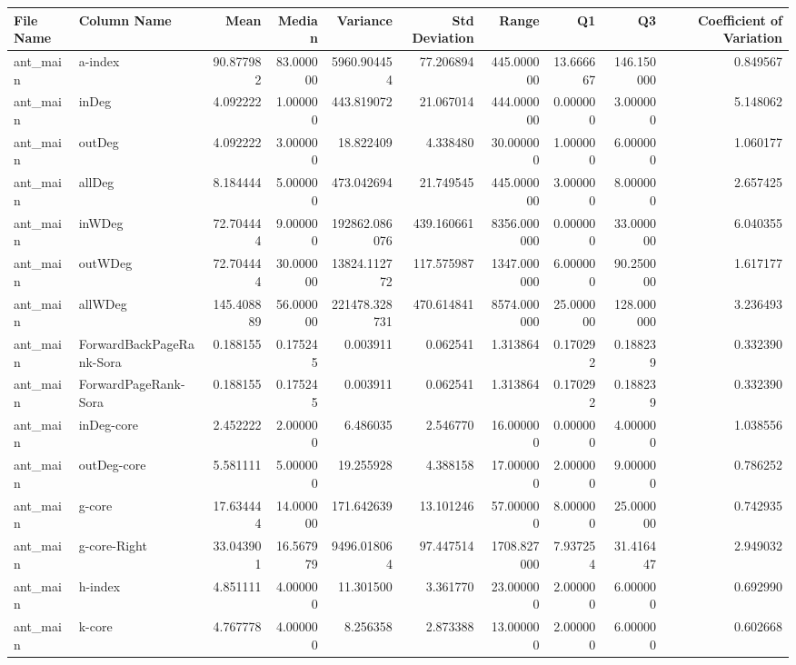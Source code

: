 \begin{tabular}{llrrrrrrrr}
\toprule
File Name & Column Name & Mean & Median & Variance & Std Deviation & Range & Q1 & Q3 & Coefficient of Variation \\
\midrule
ant_main & a-index & 90.877982 & 83.000000 & 5960.904454 & 77.206894 & 445.000000 & 13.666667 & 146.150000 & 0.849567 \\
ant_main & inDeg & 4.092222 & 1.000000 & 443.819072 & 21.067014 & 444.000000 & 0.000000 & 3.000000 & 5.148062 \\
ant_main & outDeg & 4.092222 & 3.000000 & 18.822409 & 4.338480 & 30.000000 & 1.000000 & 6.000000 & 1.060177 \\
ant_main & allDeg & 8.184444 & 5.000000 & 473.042694 & 21.749545 & 445.000000 & 3.000000 & 8.000000 & 2.657425 \\
ant_main & inWDeg & 72.704444 & 9.000000 & 192862.086076 & 439.160661 & 8356.000000 & 0.000000 & 33.000000 & 6.040355 \\
ant_main & outWDeg & 72.704444 & 30.000000 & 13824.112772 & 117.575987 & 1347.000000 & 6.000000 & 90.250000 & 1.617177 \\
ant_main & allWDeg & 145.408889 & 56.000000 & 221478.328731 & 470.614841 & 8574.000000 & 25.000000 & 128.000000 & 3.236493 \\
ant_main & ForwardBackPageRank-Sora & 0.188155 & 0.175245 & 0.003911 & 0.062541 & 1.313864 & 0.170292 & 0.188239 & 0.332390 \\
ant_main & ForwardPageRank-Sora & 0.188155 & 0.175245 & 0.003911 & 0.062541 & 1.313864 & 0.170292 & 0.188239 & 0.332390 \\
ant_main & inDeg-core & 2.452222 & 2.000000 & 6.486035 & 2.546770 & 16.000000 & 0.000000 & 4.000000 & 1.038556 \\
ant_main & outDeg-core & 5.581111 & 5.000000 & 19.255928 & 4.388158 & 17.000000 & 2.000000 & 9.000000 & 0.786252 \\
ant_main & g-core & 17.634444 & 14.000000 & 171.642639 & 13.101246 & 57.000000 & 8.000000 & 25.000000 & 0.742935 \\
ant_main & g-core-Right & 33.043901 & 16.567979 & 9496.018064 & 97.447514 & 1708.827000 & 7.937254 & 31.416447 & 2.949032 \\
ant_main & h-index & 4.851111 & 4.000000 & 11.301500 & 3.361770 & 23.000000 & 2.000000 & 6.000000 & 0.692990 \\
ant_main & k-core & 4.767778 & 4.000000 & 8.256358 & 2.873388 & 13.000000 & 2.000000 & 6.000000 & 0.602668 \\

\end{tabular}
